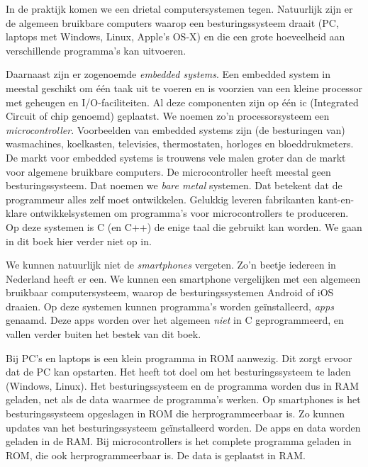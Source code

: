 In de praktijk komen we een drietal computersystemen tegen. Natuurlijk zijn er de algemeen bruikbare computers waarop een besturingssysteem draait (PC, laptops met Windows, Linux, Apple's OS-X) en die een grote hoeveelheid aan verschillende programma's kan uitvoeren.

Daarnaast zijn er zogenoemde \textsl{embedded systems}. Een embedded system in meestal geschikt om één taak uit te voeren en is voorzien van een kleine processor met geheugen en I/O-faciliteiten. Al deze componenten zijn op één ic (Integrated Circuit of chip genoemd) geplaatst. We noemen zo'n processorsysteem een \textsl{microcontroller}. Voorbeelden van embedded systems zijn (de besturingen van) wasmachines, koelkasten, televisies, thermostaten, horloges en bloeddrukmeters. De markt voor embedded systems is trouwens vele malen groter dan de markt voor algemene bruikbare computers.
De microcontroller heeft meestal geen besturingssysteem. Dat noemen we \textsl{bare metal} systemen. Dat betekent dat de programmeur alles zelf moet ontwikkelen. Gelukkig leveren fabrikanten kant-en-klare ontwikkelsystemen om programma's voor microcontrollers te produceren. Op deze systemen is C (en C++) de enige taal die gebruikt kan worden. We gaan in dit boek hier verder niet op in.
 
We kunnen natuurlijk niet de \textsl{smartphones} vergeten. Zo'n beetje iedereen in Nederland heeft er een. We kunnen een smartphone vergelijken met een algemeen bruikbaar computersysteem, waarop de besturingssystemen Android of iOS draaien. Op deze systemen kunnen programma's worden geïnstalleerd, \textsl{apps} genaamd. Deze apps worden over het algemeen \textsl{niet} in C geprogrammeerd, en vallen verder buiten het bestek van dit boek.

Bij PC's en laptops is een klein programma in ROM aanwezig. Dit zorgt ervoor dat de PC kan opstarten. Het heeft tot doel om het besturingssysteem te laden (Windows, Linux). Het besturingssysteem en de programma worden dus in RAM geladen, net als de data waarmee de programma's werken. Op smartphones is het besturingssysteem opgeslagen in ROM die herprogrammeerbaar is. Zo kunnen updates van het besturingssysteem geïnstalleerd worden. De apps en data worden geladen in de RAM. Bij microcontrollers is het complete programma geladen in ROM, die ook herprogrammeerbaar is. De data is geplaatst in RAM.


